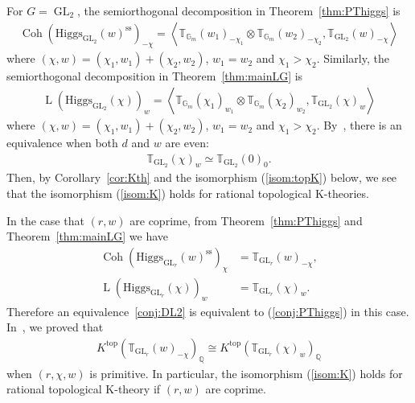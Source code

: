 \documentclass [11pt,oneside,a4paper,mathscr]{amsart}
\theoremstyle{definition}
\newcommand{\LL}{\operatorname{L}}
\newcommand{\Coh}{\operatorname{Coh}}
\newcommand{\GL}{\operatorname{GL}}
\newcommand{\Hig}{\mathrm{Higgs}}
\begin{document}
For $G=\GL_2$, the semiorthogonal decomposition in Theorem~\ref{thm:PThiggs} is 
\begin{align*}
    \Coh(\Hig_{\GL_2}(w)^{\mathrm{ss}})_{-\chi}=
    \left\langle \mathbb{T}_{\mathbb{G}_m}(w_1)_{-\chi_1}\otimes \mathbb{T}_{\mathbb{G}_m}(w_2)_{-\chi_2}, 
    \mathbb{T}_{\GL_2}(w)_{-\chi}\right\rangle
\end{align*}
where $(\chi, w)=(\chi_1, w_1)+(\chi_2, w_2)$, $w_1=w_2$ and $\chi_1>\chi_2$. 
Similarly, the semiorthogonal decomposition in Theorem~\ref{thm:mainLG} is 
\begin{align*}
    \LL(\Hig_{\GL_2}(\chi))_{w}=
    \left\langle \mathbb{T}_{\mathbb{G}_m}(\chi_1)_{w_1}\otimes \mathbb{T}_{\mathbb{G}_m}(\chi_2)_{w_2}, 
    \mathbb{T}_{\GL_2}(\chi)_{w}\right\rangle
\end{align*}
where $(\chi, w)=(\chi_1, w_1)+(\chi_2, w_2)$, $w_1=w_2$ and $\chi_1>\chi_2$. 
By~\cite[Lemma~3.8]{PThiggs}, there is an equivalence when both $d$ and $w$ are even:
\begin{align*}
 \mathbb{T}_{\GL_2}(\chi)_w\simeq\mathbb{T}_{\GL_2}(0)_0.
 \end{align*}
 Then, by Corollary~\ref{cor:Kth} and the isomorphism (\ref{isom:topK}) below, 
we see that the isomorphism (\ref{isom:K}) holds for rational topological K-theories. 

In the case that 
 $(r, w)$ are coprime, from Theorem~\ref{thm:PThiggs} and Theorem~\ref{thm:mainLG}
we have 
\begin{align*}
    \Coh(\Hig_{\GL_r}(w)^{\mathrm{ss}})_{\chi} &=\mathbb{T}_{\GL_r}(w)_{-\chi}, \\ 
    \LL(\Hig_{\GL_r}(\chi))_w&=\mathbb{T}_{\mathrm{GL}_r}(\chi)_w. 
\end{align*}
Therefore an equivalence~\eqref{conj:DL2} is equivalent to (\ref{conj:PThiggs}) in this case. 
In~\cite{PThiggs2}, we proved that 
\begin{align}\label{isom:topK}
    K^{\mathrm{top}}(\mathbb{T}_{\GL_r}(w)_{-\chi})_{\mathbb{Q}} \cong K^{\mathrm{top}}(\mathbb{T}_{\mathrm{GL}_r}(\chi)_w)_{\mathbb{Q}}
\end{align}
when $(r, \chi, w)$ is primitive. 
In particular, the isomorphism (\ref{isom:K}) holds for rational topological K-theory
if $(r, w)$ are coprime. 
\end{document}

